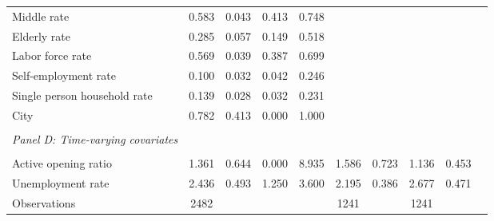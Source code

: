 \begin{tabular}{l*{9}{c}}
Middle rate         &       0.583&       0.043&       0.413&       0.748\\
Elderly rate        &       0.285&       0.057&       0.149&       0.518\\
Labor force rate    &       0.569&       0.039&       0.387&       0.699\\
Self-employment rate&       0.100&       0.032&       0.042&       0.246\\
Single person household rate&       0.139&       0.028&       0.032&       0.231\\
City                &       0.782&       0.413&       0.000&       1.000\\
\\ \multicolumn{1}{l}{\textit{Panel D: Time-varying covariates}} \\\\[-1ex]
Active opening ratio&       1.361&       0.644&       0.000&       8.935&       1.586&       0.723&       1.136&       0.453\\
Unemployment rate   &       2.436&       0.493&       1.250&       3.600&       2.195&       0.386&       2.677&       0.471\\
\midrule
Observations        &        2482&            &            &            &        1241&            &        1241&            \\
\bottomrule \end{tabular}
